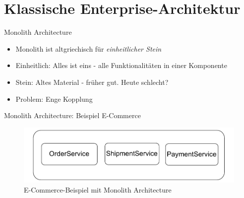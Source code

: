 \section{Klassische Enterprise-Architektur}


\begin{frame}{Monolith Architecture}
    \begin{itemize}
        \item Monolith ist altgriechisch für \textit{einheitlicher Stein}
        \item Einheitlich: Alles ist eins - alle Funktionalitäten in einer Komponente
        \item Stein: Altes Material - früher gut. Heute schlecht?
        \item Problem: Enge Kopplung
    \end{itemize}
\end{frame}

\begin{frame}{Monolith Architecture: Beispiel E-Commerce}
    \begin{figure}[!h]
        \centering
        \includegraphics[scale=0.70]{imglib/mono/mono}
        \caption{E-Commerce-Beispiel mit Monolith Architecture}
        \label{fig:mono-ecommerce}
    \end{figure}
\end{frame}

